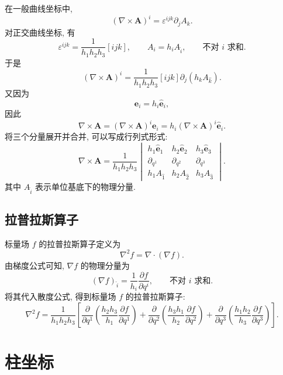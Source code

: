 在一般曲线坐标中, 
\[
(\nabla\times\bm{A})^{i}
=
\varepsilon^{ijk}\partial_{j}A_{k}.
\]
对正交曲线坐标, 有
\[
\varepsilon^{ijk}
=
\frac{1}{h_{1}h_{2}h_{3}}[ijk],
\qquad
A_{i}
=
h_{i}A_{\hat{i}},
\qquad \text{不对 } i \text{ 求和}.
\]
于是
\[
(\nabla\times\bm{A})^{i}
=
\frac{1}{h_{1}h_{2}h_{3}}[ijk]\partial_{j}(h_{k}A_{\hat{k}}).
\]
又因为
\[
\bm{e}_{i}=h_{i}\hat{\bm{e}}_{i},
\]
因此
\[
\nabla\times\bm{A}
=
(\nabla\times\bm{A})^{i}\bm{e}_{i}
=
h_{i}(\nabla\times\bm{A})^{i}\hat{\bm{e}}_{i}.
\]
将三个分量展开并合并, 可以写成行列式形式: 
\begin{equation}
	\nabla\times\bm{A}
	=
	\frac{1}{h_{1}h_{2}h_{3}}
	\begin{vmatrix}
		h_{1}\hat{\bm{e}}_{1} & h_{2}\hat{\bm{e}}_{2} & h_{3}\hat{\bm{e}}_{3}\\
		\partial_{q^{1}} & \partial_{q^{2}} & \partial_{q^{3}}\\
		h_{1}A_{\hat{1}} & h_{2}A_{\hat{2}} & h_{3}A_{\hat{3}}
	\end{vmatrix}. \label{eq:1.18}
\end{equation}
其中 $A_{\hat{i}}$ 表示单位基底下的物理分量. 

\subsection{拉普拉斯算子}

标量场 $f$ 的拉普拉斯算子定义为
\[
\nabla^{2}f=\nabla\cdot(\nabla f).
\]
由梯度公式可知, $\nabla f$ 的物理分量为
\[
(\nabla f)_{\hat{i}}
=
\frac{1}{h_{i}}\frac{\partial f}{\partial q^{i}},
\qquad \text{不对 } i \text{ 求和}.
\]
将其代入散度公式, 得到标量场 $f$ 的拉普拉斯算子: 
\begin{equation}
	\nabla^{2} f
	=
	\frac{1}{h_{1}h_{2}h_{3}}
	\left[
	\frac{\partial}{\partial q^{1}}
	\left(
	\frac{h_{2}h_{3}}{h_{1}}
	\frac{\partial f}{\partial q^{1}}
	\right)
	+
	\frac{\partial}{\partial q^{2}}
	\left(
	\frac{h_{3}h_{1}}{h_{2}}
	\frac{\partial f}{\partial q^{2}}
	\right)
	+
	\frac{\partial}{\partial q^{3}}
	\left(
	\frac{h_{1}h_{2}}{h_{3}}
	\frac{\partial f}{\partial q^{3}}
	\right)
	\right]. \label{eq:1.19}
\end{equation}

\section{柱坐标}

